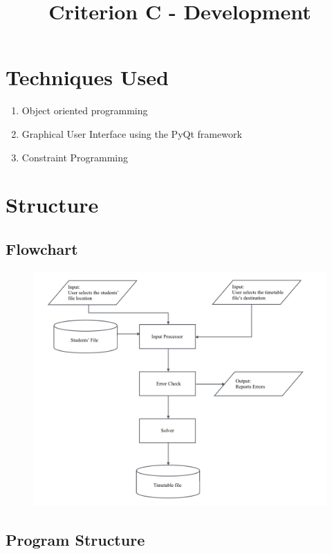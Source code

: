 \documentclass[12pt]{article}
\title{Criterion C - Development}
\author{}
\date{}
\begin{document}
\maketitle

\section{Techniques Used}

\begin{enumerate}
\item Object oriented programming
\item Graphical User Interface using the PyQt framework
\item Constraint Programming
\end{enumerate}

\section{Structure}

\subsection*{Flowchart}

\begin{figure}[H]
    \centering
    \includegraphics[width=\textwidth]{system_flowchart}
\end{figure}

\subsection*{Program Structure}
\end{document}
